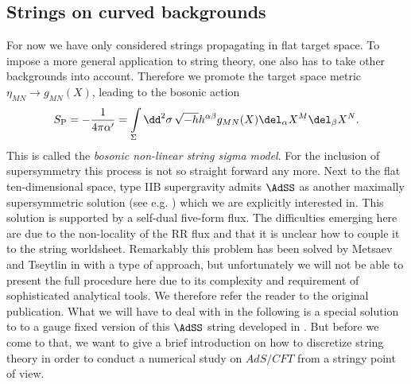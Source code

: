 \subsection{Strings on curved backgrounds}
For now we have only considered strings propagating in flat  target space. To impose a more general application to string theory, one also has to take other backgrounds into account. Therefore we promote the target space metric $\eta_{MN}\rightarrow g_{MN}(X)$, leading to the bosonic  action
%
%
\begin{equation}
S_{\rm P} = -\frac{1}{4\pi\alpha'} = \int\limits_{\Sigma} \dd^{2}\sigma\, \sqrt{-h}h^{\alpha\beta}g_{MN}(X) \del_{\alpha}X^{M}\del_{\beta}X^{N}.
\end{equation}
%
%
This is called the \textit{bosonic non-linear string sigma model}. For the inclusion of supersymmetry this process is not so straight forward any more. Next to the flat ten-dimensional  space, type IIB supergravity admits $\AdSS$ as another maximally supersymmetric solution (see e.g. \cite{Arutyunov:2009ga}) which we are explicitly interested in. This solution is supported by a self-dual  five-form flux. The difficulties emerging here are due to the non-locality of the RR flux and that it is unclear how to couple it to the string worldsheet. Remarkably this problem has been solved by Metsaev and Tseytlin in \cite{Metsaev:1998it} with a  type of approach, but unfortunately we will not be able to present the full procedure here due to its complexity and requirement of sophisticated analytical tools. We therefore refer the reader to the original publication. What we will have to deal with in the following is a special solution to to a gauge fixed version of this $\AdSS$ string developed in \cite{Metsaev:1998it}. But before we come to that, we want to give a brief introduction on how to discretize string theory in order to conduct a numerical study on $AdS/CFT$ from a stringy point of view.